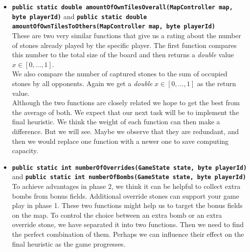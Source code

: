 \begin{itemize}
    \item \textbf{\texttt{public static double amountOfOwnTilesOverall(MapController map, byte playerId)}} and \textbf{\texttt{public static double amountOfOwnTilesToOthers(MapController map, byte playerId)}}\\
    These are two very similar functions that give us a rating about the number of stones already played by the specific player. The first function compares this number to the total size of the board and then returns a \textit{double} value $x \in [0,...,1]$.\\
    We also compare the number of captured stones to the sum of occupied stones by all opponents. Again we get a \textit{double} $x \in [0,...,1]$ as the return value.\\
    Although the two functions are closely related we hope to get the best from the average of both. We expect that our next task will be to implement the final heuristic. We think the weight of each function can then make a difference. But we will see. Maybe we observe that they are redundant, and then we would replace one function with a newer one to save computing capacity.
    
    \item \textbf{\texttt{public static int numberOfOverrides(GameState state, byte playerId)}} and \textbf{\texttt{public static int numberOfBombs(GameState state, byte playerId)}}\\
    To achieve advantages in phase 2, we think it can be helpful to collect extra bombs from bonus fields. Additional override stones can support your game play in phase 1. These two functions might help us to target the bonus fields on the map. To control the choice between an extra bomb or an extra override stone, we have separated it into two functions. Then we need to find the perfect combination of them. Perhaps we can influence their effect on the final heuristic as the game progresses. 
    

\end{itemize}
